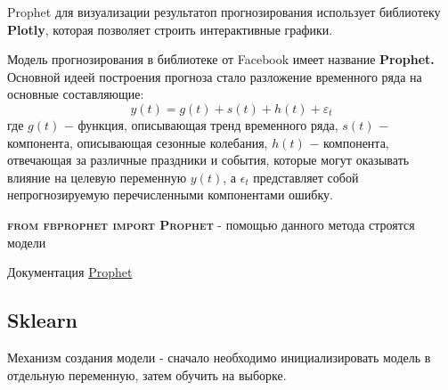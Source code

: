 \documentclass[aps,%
12pt,%
final,%
oneside,
onecolumn,%
musixtex, %
superscriptaddress,%
centertags]{article} %
\theoremstyle{plain}
\theoremstyle{definition}
\theoremstyle{remark}
\begin{document}
Prophet для визуализации результатоп прогнозирования использует библиотеку \textbf{Plotly}, которая позволяет строить интерактивные графики.

Модель прогнозирования в библиотеке от Facebook имеет название \textbf{Prophet.} Основной идеей построения прогноза стало разложение временного ряда на основные составляющие:
$$y(t) = g(t) + s(t) + h(t) + \varepsilon_t$$
где $g(t)$ $-$ функция, описывающая тренд временного ряда, $s(t)$ $-$ компонента, описывающая сезонные колебания, $h(t)$ $-$ компонента, отвечающая за различные праздники и события, которые могут оказывать влияние на целевую переменную $y(t)$, а $\epsilon_t$ представляет собой непрогнозируемую перечисленными компонентами ошибку.

\textbf{\textsc{from fbprophet import Prophet}} -  помощью данного метода строятся модели 

Документация \href{https://facebook.github.io/prophet/docs/quick\_start.html}{Prophet}

\newpage
\subsection{Sklearn}

Механизм создания модели - сначало необходимо инициализировать модель в отдельную переменную, затем обучить на выборке.
\end{document}

